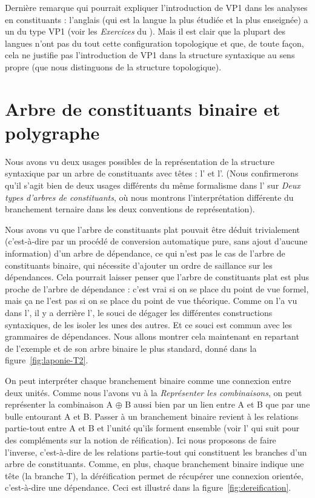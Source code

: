 {    Dernière remarque qui pourrait expliquer l’introduction de VP1 dans les analyses en constituants : l’anglais (qui est la langue la plus étudiée et la plus enseignée) a un  du type VP1 (voir les \textit{Exercices} du ). Mais il est clair que la plupart des langues n’ont pas du tout cette configuration topologique et que, de toute façon, cela ne justifie pas l’introduction de VP1 dans la structure syntaxique au sens propre (que nous distinguons de la structure topologique).
}
\section{Arbre de constituants binaire et polygraphe}\label{sec:3.4.21}

Nous avons vu deux usages possibles de la représentation de la structure syntaxique par un arbre de constituants avec têtes : l’ et l’. (Nous confirmerons qu’il s’agit bien de deux usages différents du même formalisme dans l’ sur \textit{Deux types d’arbres de constituants}, où nous montrons l’interprétation différente du branchement ternaire dans les deux conventions de représentation).

Nous avons vu que l’arbre de constituants plat pouvait être déduit trivialement (c’est-à-dire par un procédé de conversion automatique pure, sans ajout d’aucune information) d’un arbre de dépendance, ce qui n’est pas le cas de l’arbre de constituants binaire, qui nécessite d’ajouter un ordre de saillance sur les dépendances. Cela pourrait laisser penser que l’arbre de constituants plat est plus proche de l’arbre de dépendance : c’est vrai si on se place du point de vue formel, mais ça ne l’est pas si on se place du point de vue théorique. Comme on l’a vu dans l', il y a derrière l’, le souci de dégager les différentes constructions syntaxiques, de les isoler les unes des autres. Et ce souci est commun avec les grammaires de dépendances. Nous allons montrer cela maintenant en repartant de l'exemple  et de son arbre binaire le plus standard, donné dans la figure~\ref{fig:laponie-T2}.

On peut interpréter chaque branchement binaire comme une connexion entre deux unités. Comme nous l’avons vu à la  \textit{Représenter les combinaisons}, on peut représenter la combinaison A ${\oplus}$ B aussi bien par un lien entre A et B que par une bulle entourant A et B. Passer à un branchement binaire revient à  les relations partie-tout entre A et B et l’unité qu’ils forment ensemble (voir l’ qui suit pour des compléments sur la notion de réification). Ici nous proposons de faire l’inverse, c’est-à-dire de  les relations partie-tout qui constituent les branches d’un arbre de constituants. Comme, en plus, chaque branchement binaire indique une tête (la branche T), la déréification permet de récupérer une connexion orientée, c’est-à-dire une dépendance. Ceci est illustré dans la figure~\ref{fig:dereification}.

